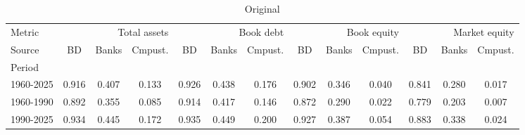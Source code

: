 
    \begin{table}[htbp]
    \centering
    \caption{Original}
    \label{tab:Table 2}
    \small
    \begin{tabular}{lcccccccccccc}
\toprule
Metric & \multicolumn{3}{r}{Total assets} & \multicolumn{3}{r}{Book debt} & \multicolumn{3}{r}{Book equity} & \multicolumn{3}{r}{Market equity} \\
Source & BD & Banks & Cmpust. & BD & Banks & Cmpust. & BD & Banks & Cmpust. & BD & Banks & Cmpust. \\
Period &  &  &  &  &  &  &  &  &  &  &  &  \\
\midrule
1960-2025 & 0.916 & 0.407 & 0.133 & 0.926 & 0.438 & 0.176 & 0.902 & 0.346 & 0.040 & 0.841 & 0.280 & 0.017 \\
1960-1990 & 0.892 & 0.355 & 0.085 & 0.914 & 0.417 & 0.146 & 0.872 & 0.290 & 0.022 & 0.779 & 0.203 & 0.007 \\
1990-2025 & 0.934 & 0.445 & 0.172 & 0.935 & 0.449 & 0.200 & 0.927 & 0.387 & 0.054 & 0.883 & 0.338 & 0.024 \\
\bottomrule
\end{tabular}

    \end{table}
    